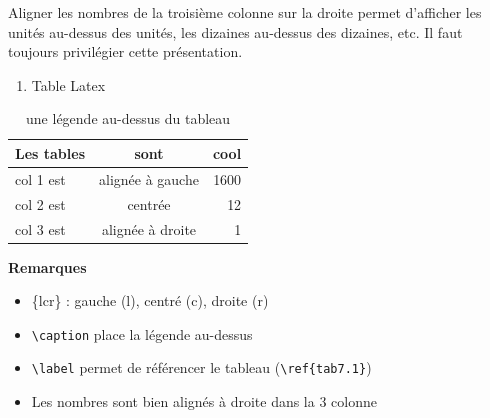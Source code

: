 \documentclass[mstat,12pt]{unswthesis}
\begin{document}
Aligner les nombres de la troisième colonne sur la droite permet
d'afficher les unités au-dessus des unités, les dizaines au-dessus des
dizaines, etc. Il faut toujours privilégier cette présentation.

\vspace{3em}

\begin{enumerate}
\def\labelenumi{\arabic{enumi}.}
\setcounter{enumi}{1}
\tightlist
\item
  Table Latex
\end{enumerate}

\begin{table}[h]
\centering
\caption{une légende au-dessus du tableau}
\label{tab7.1}
\begin{tabular}{lcr}
\hline
Les tables & sont & cool \\
\hline
col 1 est & alignée à gauche & 1600 \\
col 2 est & centrée & 12 \\
col 3 est & alignée à droite & 1 \\
\hline
\end{tabular}
\end{table}

\textbf{Remarques}

\begin{itemize}
  \item \{lcr\} : gauche (l), centré (c), droite (r)
  \item \verb|\caption| place la légende au-dessus
  \item \verb|\label| permet de référencer le tableau (\verb|\ref{tab7.1}|)
  \item Les nombres sont bien alignés à droite dans la 3\ieme{} colonne
\end{itemize}
\end{document}
